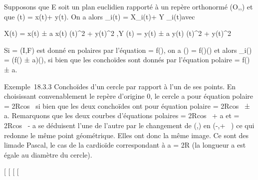 \documentclass[]{article}
\begin{document}
Supposons que E soit un plan euclidien rapporté à un repère orthonormé
(O,\vec\imath,) et que
\overrightarrowOF(t) = x(t)\vec\imath +
y(t). On a alors
\overrightarrowOF\_i(t) =
X\_i(t)\vec\imath + Y
\_i(t) avec

X(t) = x(t) ± a x(t) \over
\sqrtx(t)^2  + y(t)^2
,\quad Y (t) = y(t) ± a y(t) \over
\sqrtx(t)^2  + y(t)^2

Si \Gamma = (I,F) est donné en polaires par l'équation \rho = f(\theta), on a
\overrightarrowOF(\theta) =
f(\theta)\vecu(\theta) et alors
\overrightarrowOF\_i(\theta) = (f(\theta) ±
a)\vecu(\theta), si bien que les conchoïdes sont donnés
par l'équation polaire \rho = f(\theta) ± a.

Exemple~18.3.3 Conchoïdes d'un cercle par rapport à l'un de ses points.
En choisissant convenablement le repère d'origine 0, le cercle a pour
équation polaire \rho = 2Rcos~ \theta si bien que les
deux conchoïdes ont pour équation polaire \rho =
2Rcos~ \theta ± a. Remarquons que les deux courbes
d'équations polaires \rho = 2Rcos~ \theta + a et \rho =
2Rcos~ \theta - a se déduisent l'une de l'autre par
le changement de (\rho,\theta) en (-\rho,\theta + \pi~) ce qui redonne le même point
géométrique. Elles ont donc la même image. Ce sont des
lima\ccons de Pascal, le cas de la cardioïde
correspondant à a = 2R (la longueur a est égale au diamètre du cercle).

{[}
{[}
{[}
{[}
\end{document}

